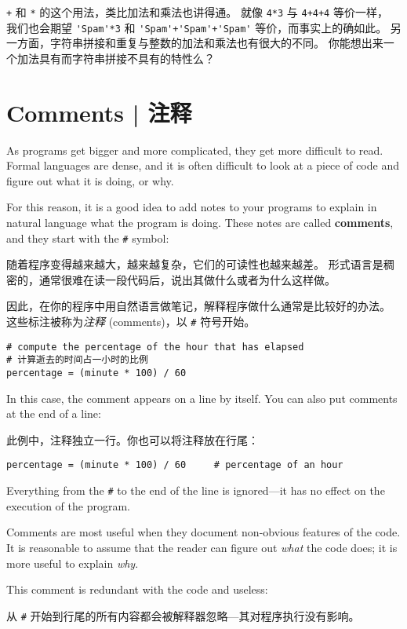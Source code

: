\lstinline{+} 和 \lstinline{*} 的这个用法，类比加法和乘法也讲得通。 就像 \lstinline{4*3} 与 \lstinline{4+4+4} 等价一样， 我们也会期望 \lstinline{'Spam'*3} 和 \lstinline{'Spam'+'Spam'+'Spam'} 等价，而事实上的确如此。 另一方面，字符串拼接和重复与整数的加法和乘法也有很大的不同。 你能想出来一个加法具有而字符串拼接不具有的特性么？


\section{Comments  |  注释}

As programs get bigger and more complicated, they get more difficult
to read.  Formal languages are dense, and it is often difficult to
look at a piece of code and figure out what it is doing, or why.

For this reason, it is a good idea to add notes to your programs to explain
in natural language what the program is doing.  These notes are called
{\bf comments}, and they start with the \verb"#" symbol:

随着程序变得越来越大，越来越复杂，它们的可读性也越来越差。 形式语言是稠密的，通常很难在读一段代码后，说出其做什么或者为什么这样做。

因此，在你的程序中用自然语言做笔记，解释程序做什么通常是比较好的办法。 这些标注被称为\emph{注释} (comments)，以 \lstinline{#} 符号开始。

\begin{lstlisting}
# compute the percentage of the hour that has elapsed
# 计算逝去的时间占一小时的比例
percentage = (minute * 100) / 60
\end{lstlisting}
%
In this case, the comment appears on a line by itself.  You can also put
comments at the end of a line:

此例中，注释独立一行。你也可以将注释放在行尾：

\begin{lstlisting}
percentage = (minute * 100) / 60     # percentage of an hour
\end{lstlisting}
%
Everything from the {\tt \#} to the end of the line is ignored---it
has no effect on the execution of the program.

Comments are most useful when they document non-obvious features of
the code.  It is reasonable to assume that the reader can figure out
{\em what} the code does; it is more useful to explain {\em why}.

This comment is redundant with the code and useless:

从 \lstinline{#} 开始到行尾的所有内容都会被解释器忽略—其对程序执行没有影响。

